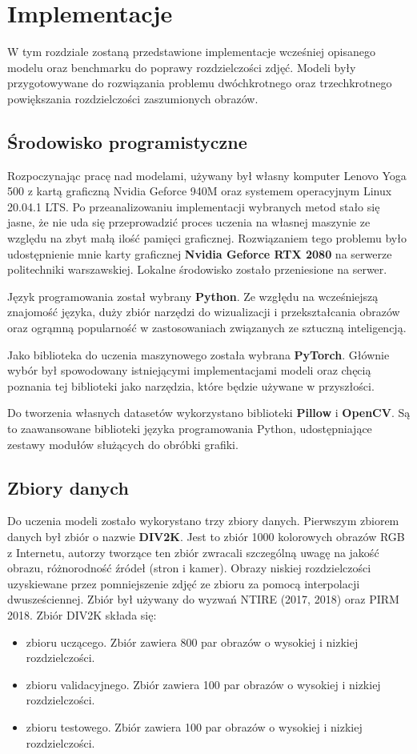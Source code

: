 \documentclass[a4paper,12pt,twoside,openany]{report}
\begin{document}
\chapter{Implementacje}
W tym rozdziale zostaną przedstawione implementacje wcześniej opisanego modelu oraz benchmarku do poprawy rozdzielczości zdjęć.  Modeli były przygotowywane do rozwiązania problemu dwóchkrotnego oraz trzechkrotnego powiększania rozdzielczości zaszumionych obrazów.

\section{Środowisko programistyczne}
Rozpoczynając pracę nad modelami, używany był własny komputer Lenovo Yoga 500 z kartą graficzną Nvidia Geforce 940M oraz systemem operacyjnym Linux 20.04.1 LTS. Po przeanalizowaniu implementacji wybranych metod stało się jasne, że nie uda się przeprowadzić proces uczenia na własnej maszynie ze względu na zbyt małą ilość pamięci graficznej. Rozwiązaniem tego problemu było udostępnienie mnie karty graficznej \textbf{Nvidia Geforce RTX 2080} na serwerze politechniki warszawskiej. Lokalne środowisko zostało przeniesione  na serwer.

Język programowania został wybrany \textbf{Python}. Ze wzgłędu na wcześniejszą znajomość języka, duży  zbiór narzędzi do wizualizacji i przekształcania obrazów oraz  ogrąmną popularność w zastosowaniach związanych ze sztuczną inteligencją.

Jako biblioteka do uczenia maszynowego została wybrana \textbf{PyTorch}. Głównie wybór był spowodowany istniejącymi implementacjami modeli oraz chęcią poznania tej biblioteki jako narzędzia, które będzie używane w przyszłości.

Do tworzenia własnych datasetów wykorzystano biblioteki \textbf{Pillow} i \textbf{OpenCV}. Są to zaawansowane biblioteki języka programowania Python, udostępniające zestawy modułów służących do obróbki grafiki.


\section{Zbiory danych}
Do uczenia modeli zostało wykorystano trzy zbiory danych. Pierwszym zbiorem danych był  zbiór o nazwie \textbf{DIV2K}. Jest to zbiór 1000 kolorowych obrazów RGB z Internetu, autorzy tworzące ten zbiór zwracali szczególną uwagę na jakość obrazu, różnorodność źródeł (stron i kamer). Obrazy niskiej rozdzielczości uzyskiewane przez pomniejszenie zdjęć ze zbioru za pomocą interpolacji dwusześciennej. Zbiór był używany do wyzwań NTIRE (2017, 2018) oraz PIRM 2018. Zbiór DIV2K składa się: 
\begin{itemize}
	\item zbioru uczącego. Zbiór zawiera 800 par obrazów  o  wysokiej  i nizkiej  rozdzielczości.
	\item zbioru validacyjnego.  Zbiór zawiera 100 par obrazów  o  wysokiej  i nizkiej  rozdzielczości.
	\item zbioru testowego. Zbiór zawiera 100 par obrazów  o  wysokiej  i nizkiej  rozdzielczości.
\end{itemize}
\end{document}
